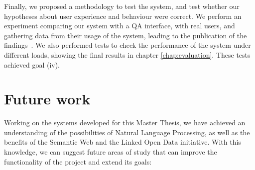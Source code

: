 Finally, we proposed a methodology to test the system, and test whether our hypotheses about user experience and behaviour were correct. We perform an experiment comparing our system with a \ac{QA} interface, with real users, and gathering data from their usage of the system, leading to the publication of the findings~\cite{Coro1509Personal}. We also performed tests to check the performance of the system under different loads, showing the final results in chapter \ref{chap:evaluation}. These tests achieved goal (iv).

\section{Future work}

Working on the systems developed for this Master Thesis, we have achieved an understanding of the possibilities of Natural Language Processing, as well as the benefits of the Semantic Web and the Linked Open Data initiative. With this knowledge, we can suggest future areas of study that can improve the functionality of the project and extend its goals:

